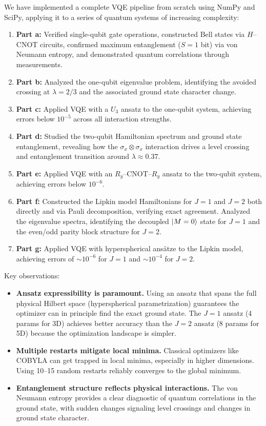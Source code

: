 \documentclass[11pt]{article}
\begin{document}
We have implemented a complete VQE pipeline from scratch using NumPy and SciPy, applying it to a series of quantum systems of increasing complexity:

\begin{enumerate}[nosep]
  \item \textbf{Part a:} Verified single-qubit gate operations, constructed Bell states via $H$--CNOT circuits, confirmed maximum entanglement ($S = 1$ bit) via von Neumann entropy, and demonstrated quantum correlations through measurements.
  \item \textbf{Part b:} Analyzed the one-qubit eigenvalue problem, identifying the avoided crossing at $\lambda = 2/3$ and the associated ground state character change.
  \item \textbf{Part c:} Applied VQE with a $U_3$ ansatz to the one-qubit system, achieving errors below $10^{-5}$ across all interaction strengths.
  \item \textbf{Part d:} Studied the two-qubit Hamiltonian spectrum and ground state entanglement, revealing how the $\sigma_x \otimes \sigma_x$ interaction drives a level crossing and entanglement transition around $\lambda \approx 0.37$.
  \item \textbf{Part e:} Applied VQE with an $R_y$--CNOT--$R_y$ ansatz to the two-qubit system, achieving errors below $10^{-6}$.
  \item \textbf{Part f:} Constructed the Lipkin model Hamiltonians for $J = 1$ and $J = 2$ both directly and via Pauli decomposition, verifying exact agreement. Analyzed the eigenvalue spectra, identifying the decoupled $\ket{M=0}$ state for $J = 1$ and the even/odd parity block structure for $J = 2$.
  \item \textbf{Part g:} Applied VQE with hyperspherical ans\"atze to the Lipkin model, achieving errors of $\sim 10^{-6}$ for $J = 1$ and $\sim 10^{-4}$ for $J = 2$.
\end{enumerate}

Key observations:
\begin{itemize}[nosep]
  \item \textbf{Ansatz expressibility is paramount.} Using an ansatz that spans the full physical Hilbert space (hyperspherical parametrization) guarantees the optimizer can in principle find the exact ground state. The $J = 1$ ansatz (4 params for 3D) achieves better accuracy than the $J = 2$ ansatz (8 params for 5D) because the optimization landscape is simpler.
  \item \textbf{Multiple restarts mitigate local minima.} Classical optimizers like COBYLA can get trapped in local minima, especially in higher dimensions. Using 10--15 random restarts reliably converges to the global minimum.
  \item \textbf{Entanglement structure reflects physical interactions.} The von Neumann entropy provides a clear diagnostic of quantum correlations in the ground state, with sudden changes signaling level crossings and changes in ground state character.
\end{itemize}
\end{document}
